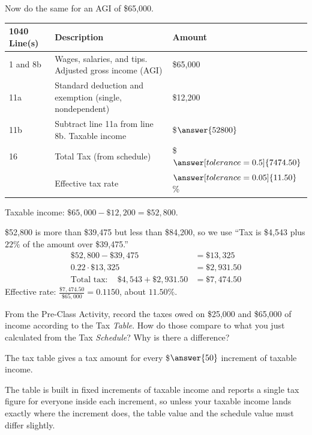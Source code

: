 \documentclass[12pt]{ximera}
\begin{document}
\begin{problem}
Now do the same for an AGI of \$65,000.

\begin{center}
\begin{tabular}{|l|l|l|}
\hline
1040 Line(s) & Description & Amount \\
\hline
1 and 8b & Wages, salaries, and tips. Adjusted gross income (AGI) & \$65,000 \\
\hline
11a & Standard deduction and exemption (single, nondependent) & \$12,200 \\
\hline
11b & Subtract line 11a from line 8b. Taxable income & \$$\answer{52800}$ \\
\hline
16 & Total Tax (from schedule) & \$$\answer[tolerance=0.5]{7474.50}$ \\
\hline
 & Effective tax rate & $\answer[tolerance=0.05]{11.50}$\% \\
\hline
\end{tabular}
\end{center}

\begin{solution}
Taxable income: $\$65{,}000 - \$12{,}200 = \$52{,}800$.

\$52,800 is more than \$39,475 but less than \$84,200, so we use ``Tax is \$4,543
plus $22\%$ of the amount over \$39,475.''
\[
\begin{aligned}
\$52{,}800 - \$39{,}475 &= \$13{,}325 \\
0.22 \cdot \$13{,}325 &= \$2{,}931.50 \\
\text{Total tax}: \quad \$4{,}543 + \$2{,}931.50 &= \$7{,}474.50
\end{aligned}
\]
Effective rate: $\frac{\$7{,}474.50}{\$65{,}000} = 0.1150$, about $11.50\%$.
\end{solution}
\end{problem}

\begin{problem}
From the Pre-Class Activity, record the taxes owed on \$25,000 and \$65,000 of income
according to the Tax \emph{Table}. How do those compare to what you just calculated
from the Tax \emph{Schedule}? Why is there a difference?

\begin{freeResponse}
\end{freeResponse}

The tax table gives a tax amount for every \$$\answer{50}$ increment of taxable income.

\begin{solution}
The table is built in fixed increments of taxable income and reports a single tax
figure for everyone inside each increment, so unless your taxable income lands exactly
where the increment does, the table value and the schedule value must differ slightly.
\end{solution}
\end{problem}
\end{document}
